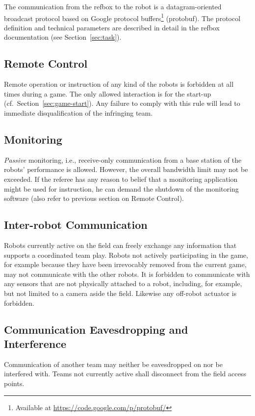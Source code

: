 \documentclass[12pt,twoside]{article}
\newcommand{\refsec}[1]{Section~\ref{#1}}
\begin{document}
The communication from the \ac{refbox} to the robot is a datagram-oriented
broadcast protocol based on Google protocol buffers\footnote{Available
at \mbox{\url{https://code.google.com/p/protobuf/}}} (protobuf). The
protocol definition and technical parameters are described in detail
in the \ac{refbox} documentation (see \refsec{sec:task}).

\subsection{Remote Control}
\label{sec:remote-control}
Remote operation or instruction of any kind of the robots is forbidden
at all times during a game. The only allowed interaction is for the
start-up (cf.~\refsec{sec:game-start}). Any failure to comply with
this rule will lead to immediate disqualification of the infringing
team.

\subsection{Monitoring}
\label{sec:monitoring}
\emph{Passive} monitoring, i.e., receive-only communication from a base
station of the robots' performance is allowed. However, the overall
bandwidth limit may not be exceeded.
If the referee has any reason to belief that a monitoring application
might be used for instruction, he can demand the shutdown of the
monitoring software (also refer to previous section on Remote
Control).

\subsection{Inter-robot Communication}
\label{sec:inter-robot-comm}
Robots currently active on the field can freely exchange any
information that supports a coordinated team play. Robots not actively
participating in the game, for example because they have been
irrevocably removed from the current game, may not communicate with
the other robots. It is forbidden to communicate with any sensors that
are not physically attached to a robot, including, for example, but
not limited to a camera aside the field. Likewise any off-robot
actuator is forbidden.

\subsection{Communication Eavesdropping and Interference}
\label{sec:comm-tampering}
Communication of another team may neither be eavesdropped on nor be
interfered with. Teams not currently active shall disconnect from the
field access points.
\end{document}
